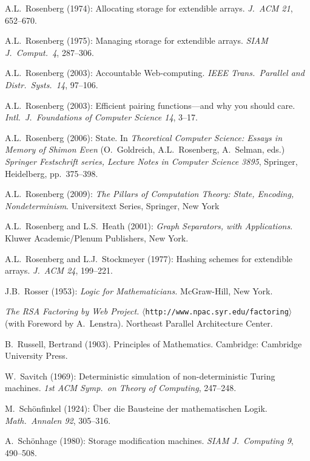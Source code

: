\begin{thebibliography}{999}
A.L.~Rosenberg (1974): Allocating storage for extendible arrays.  {\it
J.~ACM 21}, 652--670.

A.L.~Rosenberg (1975): Managing storage for extendible arrays.  {\it
SIAM J.~Comput.~4}, 287--306.

A.L.~Rosenberg (2003): Accountable Web-computing.  {\it IEEE
Trans.~Parallel and Distr.~Systs.~14}, 97--106.

A.L.~Rosenberg (2003): Efficient pairing functions---and why you
should care.  {\it Intl.~J.~Foundations of Computer Science 14},
3--17.

A.L.~Rosenberg (2006): State.  In {\it Theoretical Computer Science:
Essays in Memory of Shimon Even} (O.~Goldreich, A.L.~Rosenberg,
A.~Selman, eds.)  {\it Springer Festschrift series, Lecture Notes in
Computer Science 3895}, Springer, Heidelberg, pp.~375--398.

A.L.~Rosenberg (2009):
{\it The Pillars of Computation Theory: State, Encoding,
  Nondeterminism}.
Universitext Series, Springer, New York 

A.L.~Rosenberg and L.S.~Heath (2001):
{\it Graph Separators, with Applications}.
Kluwer Academic/Plenum Publishers, New York.

A.L.~Rosenberg and L.J.~Stockmeyer (1977): Hashing schemes for
extendible arrays.  {\it J.~ACM 24}, 199--221.

J.B.~Rosser (1953):
{\it Logic for Mathematicians.}
McGraw-Hill, New York.

{\it The RSA Factoring by Web Project.}
$\langle${\tt http://www.npac.syr.edu/factoring}$\rangle$ (with
Foreword by A.~Lenstra).  Northeast Parallel Architecture Center.

B.~Russell, Bertrand (1903). Principles of Mathematics. Cambridge:
Cambridge University Press. 



W.~Savitch (1969): Deterministic simulation of non-deterministic
Turing machines.  {\it 1st ACM Symp.~on Theory of Computing},
247--248.

M.~Sch\"onfinkel (1924): \"{U}ber die Bausteine der mathematischen
Logik.  {\it Math.~Annalen 92}, 305--316.

A.~Sch\"{o}nhage (1980): Storage modification machines.  {\it SIAM
J.~Computing 9}, 490--508.


\end{thebibliography}
